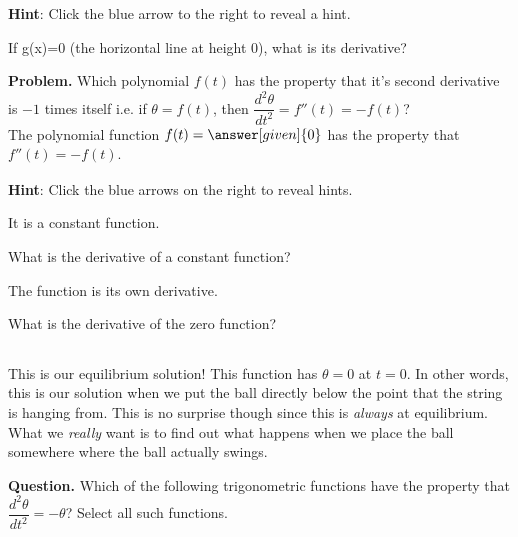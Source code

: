 \documentclass[handout,nooutcomes]{ximera}
\begin{document}
\begin{example}
\begin{explanation}
\textbf{Hint}: Click the blue arrow to the right to reveal a hint.
\begin{expandable}
If g(x)=0 (the horizontal line at height 0), what is its derivative?\\
\end{expandable}
\medskip

\textbf{Problem. } Which polynomial $f(t)$ has the property that it's second
derivative is $-1$ times itself i.e. if
$\theta=f(t)$, then $\dfrac{d^2 \theta}{d t^2} = f''(t) = -f(t)$?\\


The polynomial function $f(t) = \answer[given]{0}$ has the property that $f''(t) = -f(t)$.\\

$\phantom{.}$\\
\medskip

\textbf{Hint}: Click the blue arrows on the right to reveal hints.\\

\begin{expandable}
It is a constant function.
\begin{expandable}
What is the derivative of a constant function?
\begin{expandable}
The function is its own derivative.
\begin{expandable}
What is the derivative of the zero function?
\end{expandable}
\end{expandable}
\end{expandable}
\end{expandable}

$\phantom{.}$\\
\medskip


This is our equilibrium solution! This function has $\theta=0$ at $t=0$. In other
words, this is our solution when we put the ball directly below the point
that the string is hanging from. This is no surprise though since this
is \textit{always} at equilibrium. What we \emph{really} want is to find out what happens
when we place the ball somewhere where the ball actually swings.


\textbf{Question.}  Which of the following trigonometric functions have the property that
$\dfrac{d^2 \theta}{d t^2} = -\theta$? Select all such functions.
\begin{selectAll}
\end{selectAll}
$\phantom{.}$
\medskip



\end{explanation}
\end{example}
\end{document}
